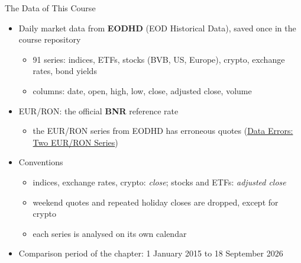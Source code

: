 \begin{frame}{The Data of This Course}
\itemsize{\small}
\begin{itemize}
    \item Daily market data from \textbf{EODHD} (EOD Historical Data), saved once in the course repository
    \begin{itemize}
        \item 91 series: indices, ETFs, stocks (BVB, US, Europe), crypto, exchange rates, bond yields
        \item columns: date, open, high, low, close, adjusted close, volume
    \end{itemize}
    \item EUR/RON: the official \textbf{BNR} reference rate
    \begin{itemize}
        \item the EUR/RON series from EODHD has erroneous quotes (\hyperlink{ch1-eurron}{\textcolor{MainBlue}{Data Errors: Two EUR/RON Series}})
    \end{itemize}
    \item Conventions
    \begin{itemize}
        \item indices, exchange rates, crypto: \textit{close}; stocks and ETFs: \textit{adjusted close}
        \item weekend quotes and repeated holiday closes are dropped, except for crypto
        \item each series is analysed on its own calendar
    \end{itemize}
    \item Comparison period of the chapter: 1 January 2015 to 18 September 2026
\end{itemize}
\end{frame}


